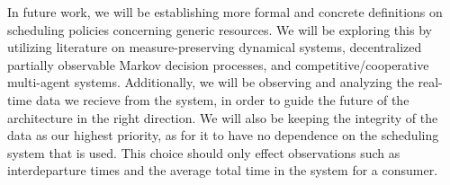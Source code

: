 \documentclass{article}
\theoremstyle{definition}
\theoremstyle{remark}
\begin{document}
	In future work, we will be establishing more formal and concrete definitions on scheduling policies concerning generic resources. We will be exploring this by utilizing literature on measure-preserving dynamical systems, decentralized partially observable Markov decision processes, and competitive/cooperative multi-agent systems. Additionally, we will be observing and analyzing the real-time data we recieve from the system, in order to guide the future of the architecture in the right direction. We will also be keeping the integrity of the data as our highest priority, as for it to have no dependence on the scheduling system that is used. This choice should only effect observations such as interdeparture times and the average total time in the system for a consumer.

	\newpage
	
	\cite{carastan2017obtaining}

	\printbibliography
\end{document}
